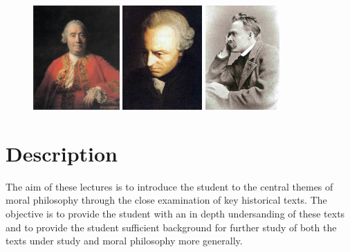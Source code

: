 \documentclass[12pt]{article}
\title{\mytitle}%
\author{\myauthor}
\date{} %
\begin{document}
\maketitle

\setlength{\parindent}{1em}


\begin{figure}[htbp]
    \centering
        \includegraphics[height=4cm]{../graphics/hume.jpg}
        \includegraphics[height=4cm]{../graphics/kant.jpg}
        \includegraphics[height=4cm]{../graphics/nietzsche.jpg}
    \label{fig:Pictures_kant}
\end{figure}

\section{Description}\label{sec:description} %

The aim of these lectures is to introduce the student to the central themes of moral philosophy through the close examination of key historical texts. The objective is to provide the student with an in depth undersanding of these texts and to provide the student sufficient background for further study of both the texts under study and moral philosophy more generally.
\end{document}
